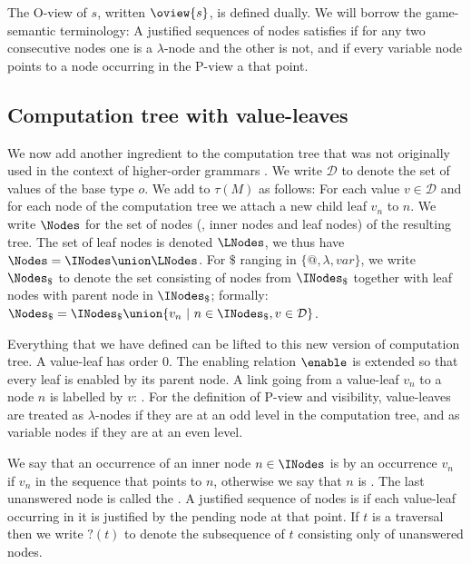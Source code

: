 The O-view of $s$, written $\oview{s}$, is defined dually. We will
borrow the game-semantic terminology: A justified sequences of nodes
satisfies  if for any two consecutive nodes one
is a $\lambda$-node and the other is not, and 
if every variable node points to a node occurring in the P-view a
that point.

\subsection{Computation tree with value-leaves}


We now add another ingredient to the computation tree that was not
originally used in the context of higher-order grammars \cite{OngLics2006}.  We write $\mathcal{D}$ to
denote the set of values of the base type $o$.  We add
 to $\tau(M)$ as follows: For each value $v
\in \mathcal{D}$ and for each node of the computation tree we attach a new child
leaf $v_n$ to $n$. We write $\Nodes$ for the set of nodes (\ie, inner nodes and leaf nodes) of the
resulting tree. The set of leaf nodes is denoted $\LNodes$, we thus have $\Nodes = \INodes \union \LNodes$.
For $\$$ ranging in $\{@, \lambda, var \}$, we write $\Nodes_\$$ to denote the set consisting of nodes from $\INodes_\$$ together with leaf nodes with parent node in $\INodes_\$$; formally:
$\Nodes_\$ = \INodes_\$ \union \{ v_n \ | \ n \in \INodes_\$, v \in \mathcal{D} \}$.


Everything that we have defined can be lifted to this new version of
computation tree. A value-leaf has order $0$. The enabling relation
$\enable$ is extended so that every leaf is enabled by its parent
node. A link going from a value-leaf $v_n$ to a node $n$ is labelled
by $v$: . For the
definition of P-view and visibility, value-leaves are treated as
$\lambda$-nodes if they are at an odd level in the computation tree,
and as variable nodes if they are at an even level.

We say that an occurrence of an inner node $n \in \INodes$ is
 by an occurrence $v_n$ if $v_n$ in
the sequence that points to $n$, otherwise we say that $n$ is
. The last unanswered node is called the
.  A justified sequence of nodes is
 if each value-leaf occurring in it is justified by the pending node at that point.  If $t$ is a traversal then we write
$?(t)$ to denote the subsequence of $t$ consisting only of
unanswered nodes.

